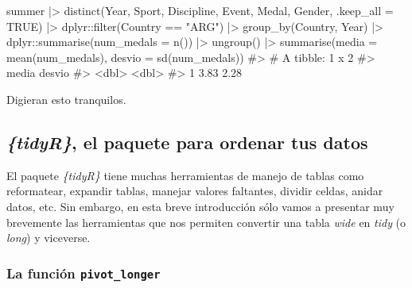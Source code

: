 \documentclass[
  letterpaper,
  DIV=11,
  numbers=noendperiod,
  oneside]{scrreprt}
\newenvironment{Shaded}{\begin{snugshade}}{\end{snugshade}}
\newcommand{\AttributeTok}[1]{\textcolor[rgb]{0.40,0.45,0.13}{#1}}
\newcommand{\CommentTok}[1]{\textcolor[rgb]{0.37,0.37,0.37}{#1}}
\newcommand{\ConstantTok}[1]{\textcolor[rgb]{0.56,0.35,0.01}{#1}}
\newcommand{\FunctionTok}[1]{\textcolor[rgb]{0.28,0.35,0.67}{#1}}
\newcommand{\NormalTok}[1]{\textcolor[rgb]{0.00,0.23,0.31}{#1}}
\newcommand{\SpecialCharTok}[1]{\textcolor[rgb]{0.37,0.37,0.37}{#1}}
\newcommand{\StringTok}[1]{\textcolor[rgb]{0.13,0.47,0.30}{#1}}
\begin{document}
\begin{Shaded}
\begin{Highlighting}[]
\NormalTok{summer }\SpecialCharTok{|\textgreater{}} 
  \FunctionTok{distinct}\NormalTok{(Year, Sport, Discipline, Event, Medal, Gender, }\AttributeTok{.keep\_all =} \ConstantTok{TRUE}\NormalTok{) }\SpecialCharTok{|\textgreater{}}
\NormalTok{  dplyr}\SpecialCharTok{::}\FunctionTok{filter}\NormalTok{(Country }\SpecialCharTok{==} \StringTok{"ARG"}\NormalTok{) }\SpecialCharTok{|\textgreater{}}
  \FunctionTok{group\_by}\NormalTok{(Country, Year) }\SpecialCharTok{|\textgreater{}}
\NormalTok{  dplyr}\SpecialCharTok{::}\FunctionTok{summarise}\NormalTok{(}\AttributeTok{num\_medals =} \FunctionTok{n}\NormalTok{()) }\SpecialCharTok{|\textgreater{}}
  \FunctionTok{ungroup}\NormalTok{() }\SpecialCharTok{|\textgreater{}}
  \FunctionTok{summarise}\NormalTok{(}\AttributeTok{media  =} \FunctionTok{mean}\NormalTok{(num\_medals),}
            \AttributeTok{desvio =} \FunctionTok{sd}\NormalTok{(num\_medals))}
\CommentTok{\#\textgreater{} \# A tibble: 1 x 2}
\CommentTok{\#\textgreater{}   media desvio}
\CommentTok{\#\textgreater{}   \textless{}dbl\textgreater{}  \textless{}dbl\textgreater{}}
\CommentTok{\#\textgreater{} 1  3.83   2.28}
\end{Highlighting}
\end{Shaded}

Digieran esto tranquilos.

\hypertarget{tidyr-el-paquete-para-ordenar-tus-datos}{%
\subsection{\texorpdfstring{\emph{\{tidyR\}}, el paquete para ordenar
tus
datos}{\{tidyR\}, el paquete para ordenar tus datos}}\label{tidyr-el-paquete-para-ordenar-tus-datos}}

El paquete \emph{\{tidyR\}} tiene muchas herramientas de manejo de
tablas como reformatear, expandir tablas, manejar valores faltantes,
dividir celdas, anidar datos, etc.
Sin embargo, en esta breve introducción sólo vamos a presentar muy
brevemente las herramientas que nos permiten convertir una tabla
\emph{wide} en \emph{tidy} (o \emph{long}) y viceverse.

\hypertarget{la-funciuxf3n-pivot_longer}{%
\subsubsection{\texorpdfstring{La función
\texttt{pivot\_longer}}{La función pivot\_longer}}\label{la-funciuxf3n-pivot_longer}}
\end{document}
